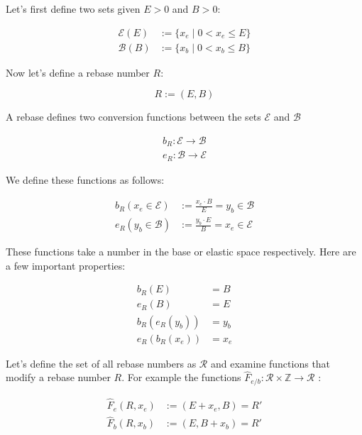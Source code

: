 \documentclass[letterpaper]{article}
\begin{document}
\begin{multicols}{2}
Let's first define two sets given $E > 0$ and $B > 0$:

\begin{align}
    \mathcal{E}(E) &:= \{x_e \mid 0 < x_e \leq E\} \label{eq:elastic-to-base} \\
    \mathcal{B}(B) &:= \{x_b \mid 0 < x_b \leq B\} \label{eq:base-to-elastic}
\end{align}

Now let's define a rebase number $R$:

\begin{equation}
    \label{eq:rebase}
    R := (E, B)
\end{equation}

A rebase defines two conversion functions between the sets $\mathcal{E}$ and $\mathcal{B}$

\begin{align}
    b_R: \mathcal{E} \rightarrow \mathcal{B} \\
    e_R: \mathcal{B} \rightarrow \mathcal{E}
\end{align}

We define these functions as follows:

\begin{align}
    \label{eq:rebase-conversion}
    b_R(x_e \in \mathcal{E}) &:= \frac{x_e \cdot B}{E} = y_b \in \mathcal{B} \\
    e_R(y_b \in \mathcal{B}) &:= \frac{y_b \cdot E}{B} = x_e \in \mathcal{E}
\end{align}

These functions take a number in the base or elastic space respectively. Here are a few important properties:

\begin{align}
    b_R(E) &= B \\
    e_R(B) &= E \\
    b_R(e_R(y_b)) &= y_b \\
    e_R(b_R(x_e)) &= x_e
\end{align}

Let's define the set of all rebase numbers as $\mathcal{R}$ and examine functions that modify a rebase number $R$. For example the functions $\hat{F}_{e/b}: \mathcal{R} \times \mathbb{Z} \rightarrow \mathcal{R}$ :

\begin{align}
    \hat{F}_e(R, x_e) &:= (E + x_e, B) = R' \label{eq:increase-elastic} \\
    \hat{F}_b(R, x_b) &:= (E, B + x_b) = R' \label{eq:increase-base}
\end{align}


\end{multicols}
\end{document}
